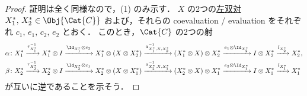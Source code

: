 \documentclass[TQFT_main]{subfiles}
\begin{document}
\begin{proof}
    証明は全く同様なので，(1) のみ示す．
    $X$ の2つの\hyperref[redef:dual]{左双対} $X_1^*,\, X_2^* \in \Obj{\Cat{C}}$ および，それらの coevaluation / evaluation をそれぞれ $c_1,\, e_1,\, c_2,\, e_2$ とおく．
    このとき，$\Cat{C}$ の2つの射
    \begin{align}
        \alpha \colon &X_1^* \xrightarrow{r^{-1}_{X_1^*}} X_1^* \otimes I \xrightarrow{\Id_{X_1^*} \otimes c_2} X_1^* \otimes (X \otimes X_2^*) \xrightarrow{a^{-1}_{X_1^*,X,X_2^*}} (X_1^* \otimes X) \otimes X_2^* \xrightarrow{e_1 \otimes \Id_{X_2^*}} I \otimes X_2^* \xrightarrow{l_{X_2^*}} X_2^*, \\
        \beta \colon &X_2^* \xrightarrow{r^{-1}_{X_2^*}} X_2^* \otimes I \xrightarrow{\Id_{X_2^*} \otimes c_1} X_2^* \otimes (X \otimes X_1^*) \xrightarrow{a^{-1}_{X_2^*,X,X_1^*}} (X_2^* \otimes X) \otimes X_1^* \xrightarrow{e_2 \otimes \Id_{X_1^*}} I \otimes X_1^* \xrightarrow{l_{X_1^*}} X_1^*
    \end{align}
    が互いに逆であることを示そう．
    

\end{proof}
\end{document}
